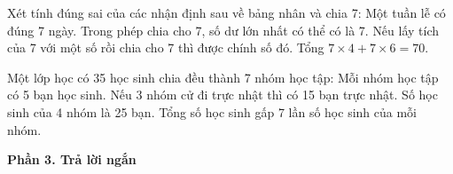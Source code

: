 \begin{ex} %
Xét tính đúng sai của các nhận định sau về bảng nhân và chia 7:
\choiceTF
{\True Một tuần lễ có đúng 7 ngày.}
{Trong phép chia cho 7, số dư lớn nhất có thể có là 7.}
{\True Nếu lấy tích của 7 với một số rồi chia cho 7 thì được chính số đó.}
{\True Tổng $7 \times 4 + 7 \times 6 = 70$.}
\end{ex}

\begin{ex} %
Một lớp học có 35 học sinh chia đều thành 7 nhóm học tập:
\choiceTF
{\True Mỗi nhóm học tập có 5 bạn học sinh.}
{\True Nếu 3 nhóm cử đi trực nhật thì có 15 bạn trực nhật.}
{Số học sinh của 4 nhóm là 25 bạn.}
{\True Tổng số học sinh gấp 7 lần số học sinh của mỗi nhóm.}
\end{ex}

\textbf{Phần 3. Trả lời ngắn}

